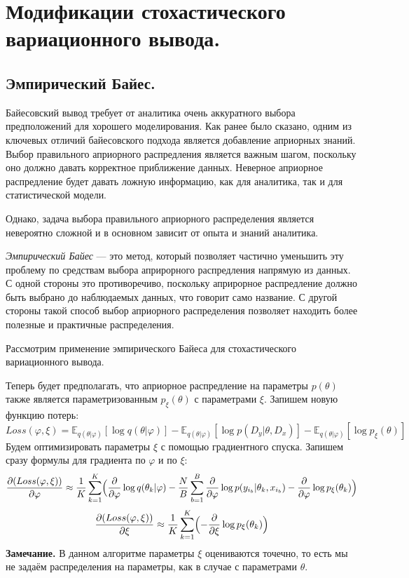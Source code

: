 \section{Модификации стохастического вариационного вывода.}
\subsection{Эмпирический Байес.}

Байесовский вывод требует от аналитика очень аккуратного выбора предположений для хорошего моделирования.
 Как ранее было сказано, одним из ключевых отличий байесовского подхода является добавление априорных знаний.
 Выбор правильного априорного распредления является важным шагом, поскольку оно должно давать корректное приближение данных.
 Неверное априорное распредление будет давать ложную информацию, как для аналитика, так и для статистической модели.

Однако, задача выбора правильного априорного распределения является невероятно сложной
 и в основном зависит от опыта и знаний аналитика.

\textit{Эмпирический Байес} --- это метод, который позволяет частично уменьшить эту проблему по средствам
 выбора априрорного распредления напрямую из данных. С одной стороны это противоречиво,
 поскольку априрорное распредление должно быть выбрано до наблюдаемых данных, что говорит само название.
 С другой стороны такой способ выбор априорного распределения позволяет находить более полезные и практичные распределения.

Рассмотрим применение эмпирического Байеса для стохастического вариационного вывода.

Теперь будет предполагать, что априорное распредление на параметры $p(\theta)$ также является параметризованным $p_{\xi}(\theta)$ с параметрами $\xi$.
 Запишем новую функцию потерь:
$$Loss(\varphi, \xi) = \mathbb{E}_{q(\theta | \varphi)}[\log q(\theta | \varphi)] - \mathbb{E}_{q(\theta | \varphi)}[\log p(D_y | \theta, D_x)] - \mathbb{E}_{q(\theta | \varphi)}[\log p_{\xi}(\theta)]$$
 Будем оптимизировать параметры $\xi$ с помощью градиентного спуска. Запишем сразу формулы для градиента по $\varphi$ и по $\xi$:
$$\frac{\partial (Loss(\varphi, \xi))}{\partial\varphi} \approx \frac{1}{K} \sum_{k=1}^K \Bigl(\frac{\partial}{\partial\varphi} \log q(\theta_k | \varphi) -
\frac{N}{B}\sum_{b=1}^B \frac{\partial}{\partial\varphi} \log p(y_{i_b} | \theta_k, x_{i_b}) -
\frac{\partial}{\partial\varphi} \log p_{\xi}(\theta_k)\Bigr)$$
$$\frac{\partial (Loss(\varphi, \xi))}{\partial\xi} \approx \frac{1}{K} \sum_{k=1}^K \Bigl(-\frac{\partial}{\partial\xi} \log p_{\xi}(\theta_k)\Bigr)$$
\textbf{Замечание.} В данном алгоритме параметры $\xi$ оцениваются точечно, то есть мы не задаём распределения на параметры, как в случае с параметрами $\theta$.
